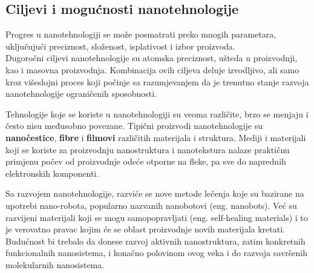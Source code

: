 \documentclass[a4paper]{article}
\begin{document}
\subsection{Ciljevi i mogućnosti nanotehnologije}
Progres u nanotehnologiji se može posmatrati preko mnogih parametara, uključujući preciznost, složenost, isplativost i izbor proizvoda.\\ 
Dugoročni ciljevi nanotehnologije su atomska preciznost, ušteda u proizvodnji, kao i masovna proizvodnja. Kombinacija ovih ciljeva deluje izvodljivo, ali samo kroz višeslojni proces koji počinje sa razumjevanjem da je trenutno stanje razvoja nanotehnologije ograničenih sposobnosti.

Tehnologije koje se koriste u nanotehnologiji su veoma različite, brzo se menjaju i često nisu međusobno povezane. Tipični proizvodi nanotehnologije su \textbf{nanočestice}, \textbf{fibre} i \textbf{filmovi} različitih materijala i struktura. 
Mediji i materijali koji se koriste za proizvodnju nanostruktura i nanotekstura nalaze praktičnu primjenu počev od proizvodnje odeće otporne na fleke, pa sve do naprednih elektronskih komponenti.

Sa razvojem nanotehnologije, razviće se nove metode lečenja koje su bazirane na upotrebi nano-robota, popularno nazvanih nanobotovi (eng. nanobots). Već su razvijeni materijali koji se mogu samopopravljati (eng. self-healing materials) i to je verovatno pravac kojim će se oblast proizvodnje novih materijala kretati.\\
Budućnost bi trebalo da donese razvoj aktivnih nanostruktura, zatim konkretnih funkcionalnih nanosistema, i konačno polovinom ovog veka i do razvoja savršenih molekularnih nanosistema.
\end{document}
